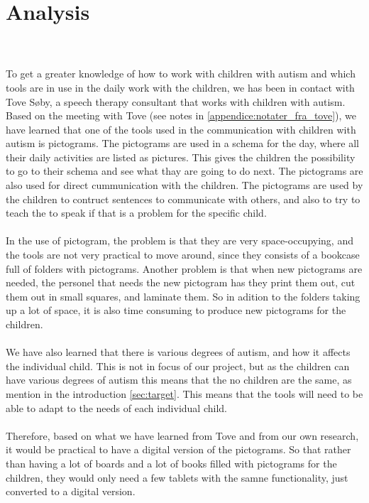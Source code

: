 \chapter{Analysis}

\textit{ }\\
\\
To get a greater knowledge of how to work with children with autism and which tools are in use in the daily work with the children, we has been in contact with  Tove S\o{}by, a speech therapy consultant that works with children with autism.\\ 

Based on the meeting with Tove (see notes in \autoref{appendice:notater_fra_tove}), we have learned that one of the tools used in the communication with children with autism is pictograms.
The pictograms are used in a schema for the day, where all their daily activities are listed as pictures. This gives the children the possibility to go to their schema and see what thay are going to do next. The pictograms are also used for direct cummunication with the children. The pictograms are used by the children to contruct sentences to communicate with others, and also to try to teach the to speak if that is a problem for the specific child.\\
\\
In the use of pictogram, the problem is that they are very space-occupying, and the tools are not very practical to move around, since they consists of a bookcase full of folders with pictograms. Another problem is that when new pictograms are needed, the personel that needs the new pictogram has they  print them out, cut them out in small squares, and laminate them. So in adition to the folders taking up a lot of space, it is also time consuming to produce new pictograms for the children.\\ 
\\
We have also learned that there is various degrees of autism, and how it affects the individual child. This is not in focus of our project, but as the children can have various degrees of autism this means that the no children are the same, as mention in the introduction \autoref{sec:target}. This means that the tools will need to be able to adapt to the needs of each individual child.\\
\\ 
Therefore, based on what we have learned from Tove and from our own research, it would be practical to have a digital version of the pictograms. So that rather than having a lot of boards and a lot of books filled with pictograms for the children, they would only need a few tablets with the samne functionality, just converted to a digital version.\\
\\
\textit{}